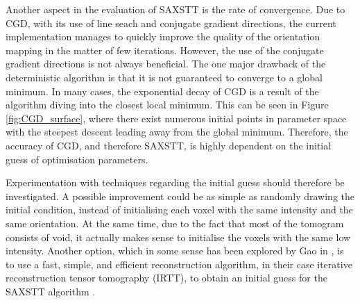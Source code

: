 Another aspect in the evaluation of SAXSTT is the rate of convergence.
Due to CGD, with its use of line seach and conjugate gradient directions,
the current implementation manages to quickly improve the quality of the orientation mapping in the matter of few iterations.
\noindent
However, the use of the conjugate gradient directions is not always beneficial.
The one major drawback of the deterministic algorithm is that it is not guaranteed to converge to a global minimum.
In many cases, the exponential decay of CGD is a result of the algorithm diving into the closest local minimum.
This can be seen in Figure \ref{fig:CGD_surface}, where there exist numerous initial points in parameter space with the steepest descent leading away from the global minimum.
Therefore, the accuracy of CGD, and therefore SAXSTT, is highly dependent on the initial guess of optimisation parameters.

Experimentation with techniques regarding the initial guess should therefore be investigated.
A possible improvement could be as simple as randomly drawing the initial condition, instead of initialising each voxel with the same intensity and the same orientation.
At the same time, due to the fact that most of the tomogram consists of void, it actually makes sense to initialise the voxels with the same low intensity.
Another option, which in some sense has been explored by Gao in \cite{PMID_30821257}, is to use a fast, simple, and efficient reconstruction algorithm,
in their case iterative reconstruction tensor tomography (IRTT), to obtain an initial guess for the SAXSTT algorithm \cite{PMID_30821257}. %

